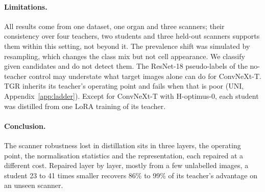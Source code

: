 \paragraph{Limitations.} All results come from one dataset, one organ and three scanners; their consistency over four
teachers, two students and three held-out scanners supports them within this setting, not beyond it. The prevalence
shift was simulated by resampling, which changes the class mix but not cell appearance. We classify given candidates and
do not detect them. The ResNet-18 pseudo-labels of the no-teacher control may understate
what target images alone can do for ConvNeXt-T. TGR inherits its teacher's operating point and fails when that is poor (UNI,
Appendix~\ref{app:ladder}). Except for ConvNeXt-T with H-optimus-0, each student was distilled from one LoRA training of
its teacher.

\paragraph{Conclusion.} The scanner robustness lost in distillation sits in three layers, the operating point, the
normalisation statistics and the representation, each repaired at a different cost. Repaired layer by layer, mostly
from a few unlabelled images, a student 23 to 41 times smaller recovers 86\% to 99\% of its teacher's advantage on an
unseen scanner.
